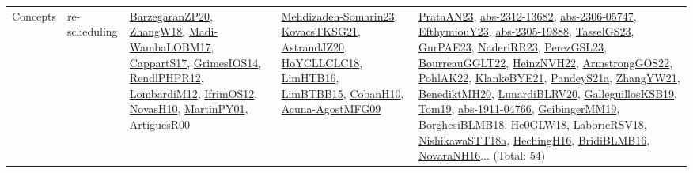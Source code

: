 {\begin{longtable}{lp{3cm}>{\raggedright}p{6cm}>{\raggedright}p{6cm}p{8cm}}
Concepts & re-scheduling & \href{papers/BarzegaranZP20.pdf}{BarzegaranZP20}\cite{BarzegaranZP20}, \href{articles/ZhangW18.pdf}{ZhangW18}\cite{ZhangW18}, \href{papers/Madi-WambaLOBM17.pdf}{Madi-WambaLOBM17}\cite{Madi-WambaLOBM17}, \href{papers/CappartS17.pdf}{CappartS17}\cite{CappartS17}, \href{articles/GrimesIOS14.pdf}{GrimesIOS14}\cite{GrimesIOS14}, \href{papers/RendlPHPR12.pdf}{RendlPHPR12}\cite{RendlPHPR12}, \href{articles/LombardiM12.pdf}{LombardiM12}\cite{LombardiM12}, \href{papers/IfrimOS12.pdf}{IfrimOS12}\cite{IfrimOS12}, \href{articles/NovasH10.pdf}{NovasH10}\cite{NovasH10}, \href{articles/MartinPY01.pdf}{MartinPY01}\cite{MartinPY01}, \href{articles/ArtiguesR00.pdf}{ArtiguesR00}\cite{ArtiguesR00} & \href{papers/Mehdizadeh-Somarin23.pdf}{Mehdizadeh-Somarin23}\cite{Mehdizadeh-Somarin23}, \href{papers/KovacsTKSG21.pdf}{KovacsTKSG21}\cite{KovacsTKSG21}, \href{articles/AstrandJZ20.pdf}{AstrandJZ20}\cite{AstrandJZ20}, \href{papers/HoYCLLCLC18.pdf}{HoYCLLCLC18}\cite{HoYCLLCLC18}, \href{papers/LimHTB16.pdf}{LimHTB16}\cite{LimHTB16}, \href{papers/LimBTBB15.pdf}{LimBTBB15}\cite{LimBTBB15}, \href{papers/CobanH10.pdf}{CobanH10}\cite{CobanH10}, \href{papers/Acuna-AgostMFG09.pdf}{Acuna-AgostMFG09}\cite{Acuna-AgostMFG09} & \href{articles/PrataAN23.pdf}{PrataAN23}\cite{PrataAN23}, \href{articles/abs-2312-13682.pdf}{abs-2312-13682}\cite{abs-2312-13682}, \href{articles/abs-2306-05747.pdf}{abs-2306-05747}\cite{abs-2306-05747}, \href{papers/EfthymiouY23.pdf}{EfthymiouY23}\cite{EfthymiouY23}, \href{articles/abs-2305-19888.pdf}{abs-2305-19888}\cite{abs-2305-19888}, \href{papers/TasselGS23.pdf}{TasselGS23}\cite{TasselGS23}, \href{articles/GurPAE23.pdf}{GurPAE23}\cite{GurPAE23}, \href{articles/NaderiRR23.pdf}{NaderiRR23}\cite{NaderiRR23}, \href{papers/PerezGSL23.pdf}{PerezGSL23}\cite{PerezGSL23}, \href{articles/BourreauGGLT22.pdf}{BourreauGGLT22}\cite{BourreauGGLT22}, \href{articles/HeinzNVH22.pdf}{HeinzNVH22}\cite{HeinzNVH22}, \href{papers/ArmstrongGOS22.pdf}{ArmstrongGOS22}\cite{ArmstrongGOS22}, \href{articles/PohlAK22.pdf}{PohlAK22}\cite{PohlAK22}, \href{papers/KlankeBYE21.pdf}{KlankeBYE21}\cite{KlankeBYE21}, \href{articles/PandeyS21a.pdf}{PandeyS21a}\cite{PandeyS21a}, \href{articles/ZhangYW21.pdf}{ZhangYW21}\cite{ZhangYW21}, \href{articles/BenediktMH20.pdf}{BenediktMH20}\cite{BenediktMH20}, \href{articles/LunardiBLRV20.pdf}{LunardiBLRV20}\cite{LunardiBLRV20}, \href{papers/GalleguillosKSB19.pdf}{GalleguillosKSB19}\cite{GalleguillosKSB19}, \href{papers/Tom19.pdf}{Tom19}\cite{Tom19}, \href{articles/abs-1911-04766.pdf}{abs-1911-04766}\cite{abs-1911-04766}, \href{papers/GeibingerMM19.pdf}{GeibingerMM19}\cite{GeibingerMM19}, \href{articles/BorghesiBLMB18.pdf}{BorghesiBLMB18}\cite{BorghesiBLMB18}, \href{papers/He0GLW18.pdf}{He0GLW18}\cite{He0GLW18}, \href{articles/LaborieRSV18.pdf}{LaborieRSV18}\cite{LaborieRSV18}, \href{papers/NishikawaSTT18a.pdf}{NishikawaSTT18a}\cite{NishikawaSTT18a}, \href{papers/HechingH16.pdf}{HechingH16}\cite{HechingH16}, \href{articles/BridiBLMB16.pdf}{BridiBLMB16}\cite{BridiBLMB16}, \href{articles/NovaraNH16.pdf}{NovaraNH16}\cite{NovaraNH16}... (Total: 54)\\

\end{longtable}}
